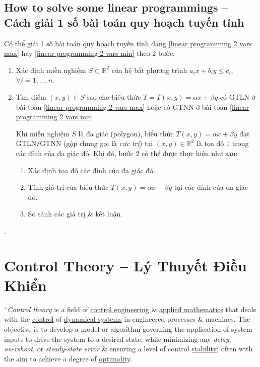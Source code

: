 \documentclass{article}
\begin{document}
\subsection{How to solve some linear programmings -- Cách giải 1 số bài toán quy hoạch tuyến tính}
Có thể giải 1 số bài toán quy hoạch tuyến tính dạng \eqref{linear programming 2 vars max} hay \eqref{linear programming 2 vars min} theo 2 bước:
\begin{enumerate}
	\item Xác định miền nghiệm $S\subset\mathbb{R}^2$ của hệ bất phương trình $a_ix + b_iy\le c_i$, $\forall i = 1,\ldots,n$.
	\item Tìm điểm $(x,y)\in S$ sao cho biểu thức $T = T(x,y) = \alpha x + \beta y$ có {\rm GTLN} ở bài toán \eqref{linear programming 2 vars max} hoặc có {\rm GTNN} ở bài toán \eqref{linear programming 2 vars min}.
	
	Khi miền nghiệm $S$ là đa giác (polygon), biểu thức $T(x,y) = \alpha x + \beta y$ đạt GTLN{\tt/}GTNN (gộp chung gọi là {\it cực trị}) tại $(x,y)\in\mathbb{R}^2$ là tọa độ 1 trong các đỉnh của đa giác đó. Khi đó, bước 2 có thể được thực hiện như sau:
	\begin{enumerate}
		\item Xác định tọa độ các đỉnh của đa giác đó.
		\item Tính giá trị của biểu thức $T(x,y) = \alpha x + \beta y$ tại các đỉnh của đa giác đó.
		\item So sánh các giá trị \& kết luận.
	\end{enumerate}
\end{enumerate}
\cite[Chuyên đề II, \S1, LT1--3, 1., 2., 3., 4., 5., pp. 20--25]{CDHT_Toan_12_Canh_Dieu}.


\section{Control Theory -- Lý Thuyết Điều Khiển}
``{\it Control theory} is a field of \href{https://en.wikipedia.org/wiki/Control_engineering}{control engineering} \& \href{https://en.wikipedia.org/wiki/Applied_mathematics}{applied mathematics} that deals with the \href{https://en.wikipedia.org/wiki/Control_system}{control} of \href{https://en.wikipedia.org/wiki/Dynamical_system}{dynamical systems} in engineered processes \& machines. The objective is to develop a model or algorithm governing the application of system inputs to drive the system to a desired state, while minimizing any {\it delay, overshoot}, or {\it steady-state error} \& ensuring a level of control \href{https://en.wikipedia.org/wiki/Stability_theory}{stability}; often with the aim to achieve a degree of \href{https://en.wikipedia.org/wiki/Optimal_control}{optimality}.
\end{document}
